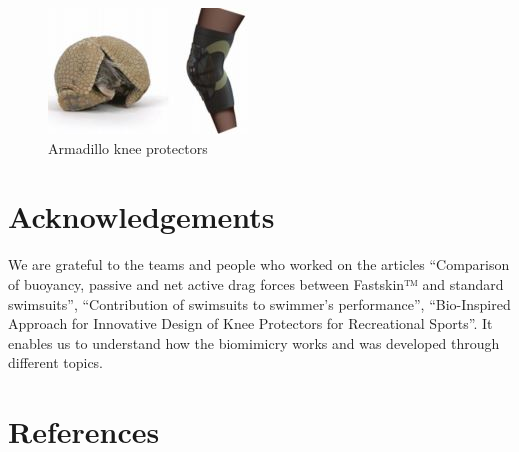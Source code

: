 \documentclass[twoside,twocolumn]{article}                          %
\begin{document}
\begin{figure}[!h]
  \begin{center}
    \includegraphics[scale=1]{arma.JPG}
  \end{center}
  \caption{Armadillo knee protectors}
  \end{figure} 

\section{Acknowledgements}
We are grateful to the teams and people who worked on the articles “Comparison of buoyancy, passive and net active drag forces between Fastskin™\cite{Fastskin} and standard swimsuits”, “Contribution of swimsuits to swimmer’s performance”\cite{Swimsuits}, “Bio-Inspired Approach for Innovative Design of Knee Protectors for Recreational Sports”\cite{armadillo}. It enables us to understand how the biomimicry works and was developed through different topics. 






\section{References}


\end{document}
